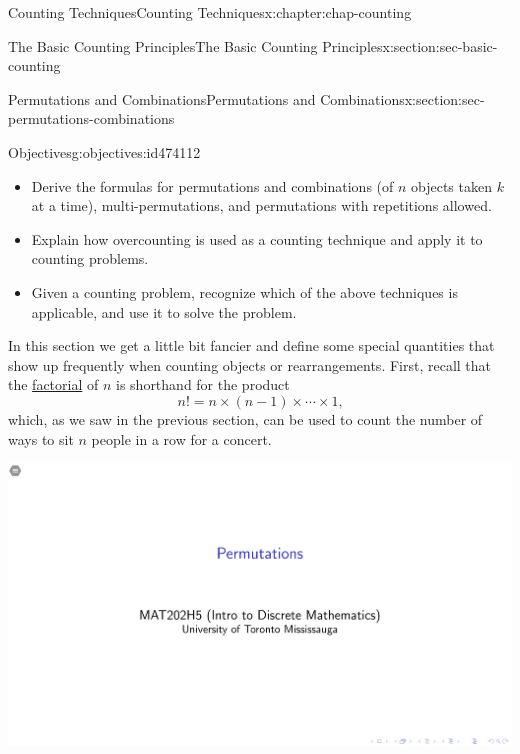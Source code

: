 \documentclass[oneside,10pt,]{book}
\numberwithin{equation}{section}
\newlength{\qrsize}
\newlength{\previewwidth}
\begin{document}
\begin{chapterptx}{Counting Techniques}{}{Counting Techniques}{}{}{x:chapter:chap-counting}
\begin{sectionptx}{The Basic Counting Principles}{}{The Basic Counting Principles}{}{}{x:section:sec-basic-counting}
\end{sectionptx}
%
%
\typeout{************************************************}
\typeout{************************************************}
%
\begin{sectionptx}{Permutations and Combinations}{}{Permutations and Combinations}{}{}{x:section:sec-permutations-combinations}
\begin{objectives}{Objectives}{g:objectives:id474112}
%
\begin{itemize}[label=\textbullet]
\item{}Derive the formulas for permutations and combinations (of \(n\) objects taken \(k\) at a time), multi-permutations, and permutations with repetitions allowed.%
\item{}Explain how overcounting is used as a counting technique and apply it to counting problems.%
\item{}Given a counting problem, recognize which of the above techniques is applicable, and use it to solve the problem.%
\end{itemize}
\end{objectives}
In this section we get a little bit fancier and define some special quantities that show up frequently when counting objects or rearrangements. First, recall that the \hyperref[x:definition:def-factorial]{factorial} of \(n\) is shorthand for the product%
\begin{equation*}
n! = n \times (n-1) \times \cdots \times 1\text{,}
\end{equation*}
which, as we saw in the previous section, can be used to count the number of ways to sit \(n\) people in a row for a concert.%
\begin{sidebyside}{1}{0}{0}{0}%
\begin{sbspanel}{1}%
\setlength{\qrsize}{9em}
\setlength{\previewwidth}{\linewidth}
\addtolength{\previewwidth}{-\qrsize}
\begin{tcbraster}[raster columns=2, raster column skip=1pt, raster halign=center, raster force size=false, raster left skip=0pt, raster right skip=0pt]%
\begin{tcolorbox}[previewstyle, width=\previewwidth]%
\includegraphics[width=0.80\linewidth,height=\qrsize,keepaspectratio]{images/04-thumb.png}%

\end{tcolorbox}
\end{tcbraster}
\end{sbspanel}
\end{sidebyside}
\end{sectionptx}
\end{chapterptx}
\end{document}
